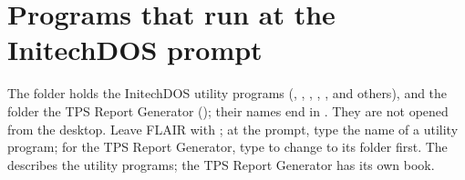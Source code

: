 \section{Programs that run at the InitechDOS prompt}
The  folder holds the InitechDOS utility programs (,
, , , ,  and
others), and the  folder the TPS Report Generator
(); their names end in .  They are not opened from
the desktop.  Leave FLAIR with ; at the prompt,
type the name of a utility program; for the TPS Report Generator, type
 to change to its folder first.  The  describes the utility
programs; the TPS Report Generator has its own book.
